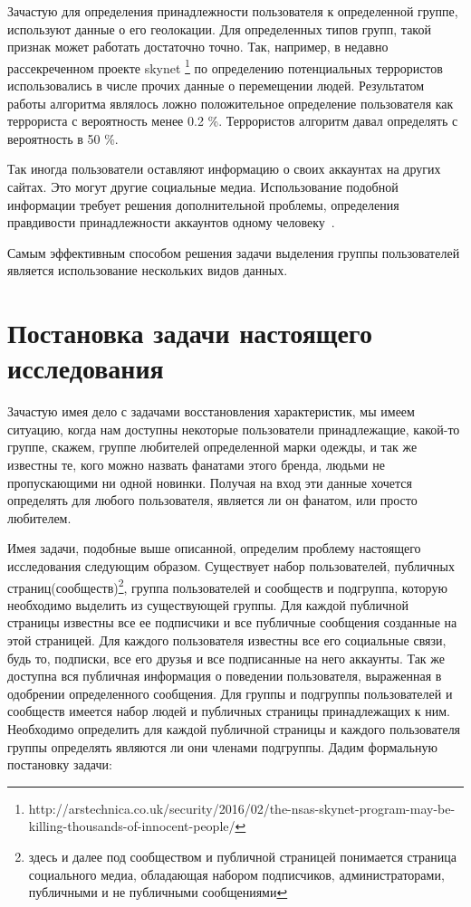 \documentclass[annotation,times,page4]{itmo-student-thesis}
\begin{document}
Зачастую для определения принадлежности пользователя к определенной группе, используют данные о его геолокации. Для определенных типов групп, такой признак может работать достаточно точно. Так, например, в недавно рассекреченном проекте skynet \footnote{http://arstechnica.co.uk/security/2016/02/the-nsas-skynet-program-may-be-killing-thousands-of-innocent-people/} по определению потенциальных террористов использовались в числе прочих данные о перемещении людей. Результатом работы алгоритма являлось ложно положительное определение пользователя как террориста с вероятность менее 0.2 \%. Террористов алгоритм давал определять с вероятность в 50 \%.

Так иногда пользователи оставляют информацию о своих аккаунтах на других сайтах. Это могут другие социальные медиа. Использование подобной информации требует решения дополнительной проблемы, определения правдивости принадлежности аккаунтов одному человеку~\cite{peled2014matching}.  

Самым эффективным способом решения задачи выделения группы пользователей является использование нескольких видов данных. 

\section{Постановка задачи настоящего исследования}
Зачастую имея дело с задачами восстановления характеристик, мы имеем ситуацию, когда нам доступны некоторые пользователи принадлежащие, какой-то группе, скажем, группе любителей определенной марки одежды, и так же известны те, кого можно назвать фанатами этого бренда, людьми не пропускающими ни одной новинки. Получая на вход эти данные хочется определять для любого пользователя, является ли он фанатом, или просто любителем.

Имея задачи, подобные выше описанной, определим проблему настоящего исследования следующим образом. Существует набор пользователей, публичных страниц(сообществ)\footnote{здесь и далее под сообществом и публичной страницей понимается страница социального медиа, обладающая набором подписчиков, администраторами, публичными и не публичными сообщениями}, группа пользователей и сообществ и подгруппа, которую необходимо выделить из существующей группы. Для каждой публичной страницы известны все ее подписчики и все публичные сообщения созданные на этой страницей. Для каждого пользователя известны все его социальные связи, будь то, подписки, все его друзья и все подписанные на него аккаунты. Так же доступна вся публичная информация о поведении пользователя, выраженная в одобрении определенного сообщения. Для группы и подгруппы пользователей и сообществ имеется набор людей и публичных страницы принадлежащих к ним. Необходимо определить для каждой публичной страницы и каждого пользователя группы определять являются ли они членами подгруппы.
\newpage
Дадим формальную постановку задачи:
\end{document}
